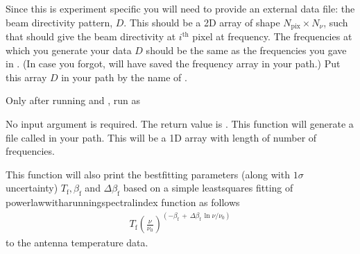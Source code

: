 \documentclass[letterpaper,10pt,english]{sphinxmanual}
\begin{document}
\sphinxAtStartPar
Since this is experiment specific you will need to provide an external data file: the beam directivity pattern, \(D\). This should be a 2D array of shape \(N_{\mathrm{pix}}\times N_{\nu}\), such that  should give the beam directivity at \(i^{\mathrm{th}}\) pixel at  frequency. The frequencies at which you generate your data \(D\) should be the same as the frequencies you gave in . (In case you forgot,  will have saved the frequency array in your  path.) Put this array \(D\) in your  path by the name of
.

\sphinxAtStartPar
Only after running  and , run  as

\begin{sphinxVerbatim}[commandchars=\\\{\}]
   

  



\end{sphinxVerbatim}

\sphinxAtStartPar
No input argument is required. The return value is . This function will generate a file called  in your path. This will be a 1D array with length of number of frequencies.

\sphinxAtStartPar
This function will also print the best\sphinxhyphen{}fitting parameters (along with \(1\sigma\) uncertainty) \(T_{\mathrm{f}}, \beta_{\mathrm{f}}\) and \(\Delta\beta_{\mathrm{f}}\) based on a simple least\sphinxhyphen{}squares fitting of power\sphinxhyphen{}law\sphinxhyphen{}with\sphinxhyphen{}a\sphinxhyphen{}running\sphinxhyphen{}spectral\sphinxhyphen{}index function as follows
\begin{equation*}
\begin{split}T_{\mathrm{f}}\left(\frac{\nu}{\nu_0}\right)^{(-\beta_{\mathrm{f}}\,+\,\Delta\beta_{\mathrm{f}}\,\ln{\nu/\nu_0})}\end{split}
\end{equation*}
\sphinxAtStartPar
to the antenna temperature data.
\end{document}
